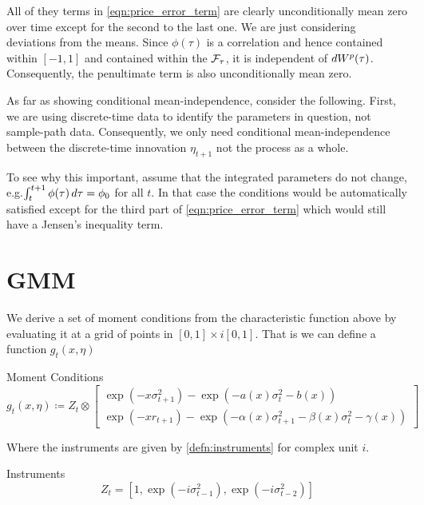 \documentclass[11pt, letterpaper, twoside, final]{article}
\begin{document}
All of they terms in  \cref{eqn:price_error_term} are clearly unconditionally mean zero over time except for the
second to the last one.
We are just considering deviations from the means.
Since $\phi(\tau)$ is a correlation and hence contained within $[-1,1]$ and contained within the $\mathcal{F}_{\tau}$, it
is independent of $\mathop{}\!d W^{p}(\tau)$.
Consequently, the penultimate term is also unconditionally mean zero. 

As far as showing conditional mean-independence, consider the following.
First, we are using discrete-time data to identify the parameters in question, not sample-path data.
Consequently, we only need conditional mean-independence between the discrete-time innovation $\eta_{t+1}$ not the
process as a whole.

To see why this important, assume that the integrated parameters do not change, e.g.\@ $\int_{t}^{t+1} \phi(\tau)
\mathop{}\!d \tau = \phi_0$ for all $t$.
In that case the conditions would be automatically satisfied except for the third part of
\cref{eqn:price_error_term} which would still have a Jensen's inequality term.





\section{GMM}\label{sec:GMM}

We derive a set of moment conditions from the characteristic function above by evaluating it at a grid of points
in $[0,1] \times i [0,1]$. 
That is we can define a function $g_t(x, \eta)$

\begin{defn}{Moment Conditions}
    \begin{equation}
        g_t(x, \eta) \coloneqq Z_t \otimes \begin{bmatrix} \exp(- x \sigma^2_{t+1}) - \exp\left( - a(x) \sigma_t^2
        - b(x) \right) \\ \exp\left(- x r_{t+1}\right) - \exp\left(- \alpha(x) \sigma^2_{t+1} - \beta(x)
        \sigma^2_t - \gamma(x)\right) \end{bmatrix}
    \end{equation}
\end{defn}

Where the instruments are given by \cref{defn:instruments} for complex unit $i$. 

\begin{defn}{Instruments}
    \label{defn:instruments}
    \begin{equation}
        Z_t = \left[1, \exp\left(- i \sigma_{t-1}^2\right), \exp\left(-i \sigma^2_{t-2}\right)\right] 
    \end{equation}
\end{defn}
\end{document}
